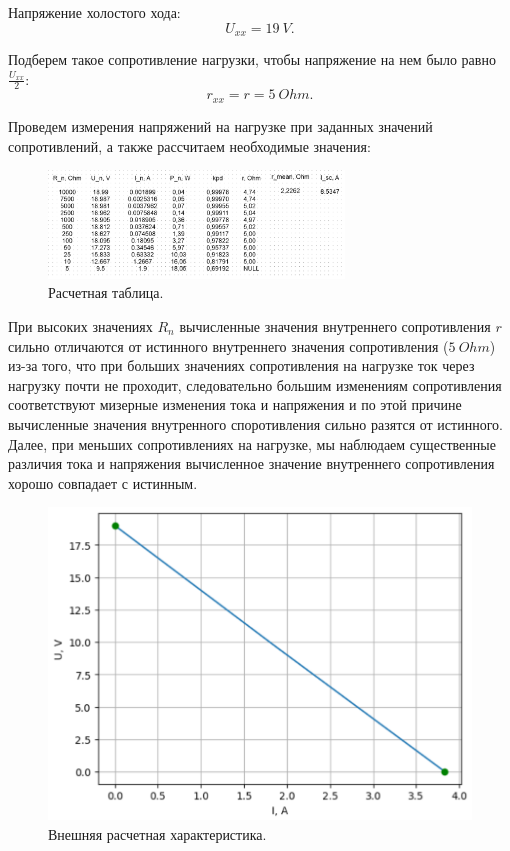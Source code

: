 \documentclass[12pt]{article}
\begin{document}
Напряжение холостого хода:
\[
    U_{xx} = 19 \ V.
\]

Подберем такое сопротивление нагрузки, чтобы напряжение на нем было равно $\frac{U_{xx}}{2}$:
\[
    r_{xx} = r = 5 \ Ohm.
\]

Проведем измерения напряжений на нагрузке при заданных значений сопротивлений, а также рассчитаем необходимые значения:
\begin{figure}[H]
    \centering
    \includegraphics[width=0.7\textwidth]{calcs.png}
    \caption{Расчетная таблица.}
    \label{fig:calcs}
\end{figure}

При высоких значениях $R_{n}$ вычисленные значения внутреннего сопротивления $r$ сильно отличаются от истинного внутреннего значения сопротивления ($5 \ Ohm$) из-за того, что при больших значениях сопротивления на нагрузке ток через нагрузку почти не проходит, следовательно большим изменениям сопротивления соответствуют мизерные изменения тока и напряжения и по этой причине вычисленные значения внутренного споротивления сильно разятся от истинного. \\
Далее, при меньших сопротивлениях на нагрузке, мы наблюдаем существенные различия тока и напряжения вычисленное значение внутреннего сопротивления хорошо совпадает с истинным.

\begin{figure}[H]
    \centering
    \includegraphics[width=\textwidth]{u_i.png}
    \caption{Внешняя расчетная характеристика.}
    \label{fig:u_i}
\end{figure}
\end{document}
